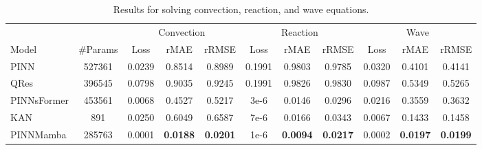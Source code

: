 \begin{table*}
\vspace{-3mm}
  \caption{Results for solving convection, reaction, and wave equations.}
  \label{sample-table}
  
  \centering
    \small
  \begin{tabular}{l|c|ccc|ccc|ccc}

    \toprule 
  & & \multicolumn{3}{c}{Convection }&\multicolumn{3}{c}{Reaction}&\multicolumn{3}{c}{Wave}\\
    \cmidrule(lr){3-5}\cmidrule(lr){6-8}\cmidrule(lr){9-11}
   Model & \#Params &Loss & rMAE & rRMSE & Loss & rMAE & rRMSE& Loss & rMAE & rRMSE
 \\   \midrule
    PINN&527361& 0.0239 & 0.8514 & 0.8989& 0.1991 & 0.9803 & 0.9785& 0.0320 & 0.4101 & 0.4141\\
    QRes & 396545& 0.0798 & 0.9035 & 0.9245& 0.1991 & 0.9826 & 0.9830& 0.0987 & 0.5349 & 0.5265\\
    PINNsFormer &453561 & 0.0068 & 0.4527 & 0.5217& 3e-6& 0.0146 & 0.0296 & 0.0216 & 0.3559 & 0.3632\\
     KAN&891& 0.0250 & 0.6049 & 0.6587& 7e-6 & 0.0166 & 0.0343& 0.0067 & 0.1433 & 0.1458\\
   \rowcolor{mygray}   PINNMamba  & 285763&0.0001 & \textbf{0.0188} & \textbf{0.0201}&1e-6&\textbf{0.0094}&\textbf{0.0217}& 0.0002 & \textbf{0.0197} & \textbf{0.0199} \\

    \bottomrule
  \end{tabular}
  \normalsize
  \label{tab:diff}
  \vspace{-4mm}
\end{table*}